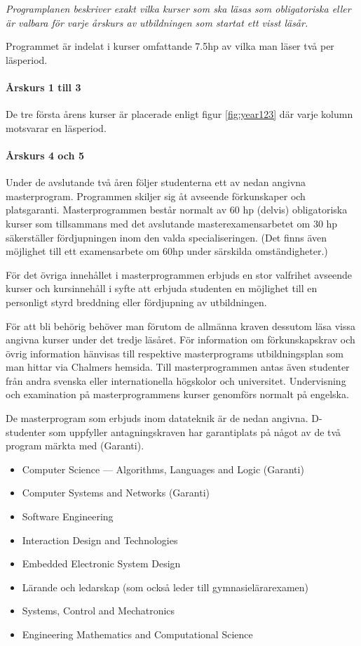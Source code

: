 \documentclass[twocolumn]{article}
\newcommand{\meta}[1]{{\small \emph{#1}}}
\begin{document}
\meta{Programplanen beskriver exakt vilka kurser som ska läsas som
  obligatoriska eller är valbara för varje årskurs av utbildningen
  som startat ett visst läsår.}

Programmet är indelat i kurser omfattande 7.5hp av vilka man läser
två per läsperiod.
\paragraph{Årskurs 1 till 3} De tre första årens kurser är placerade
enligt figur \ref{fig:year123} där varje kolumn motsvarar en läsperiod.

\paragraph{Årskurs 4 och 5}

Under de avslutande två åren följer studenterna ett av nedan angivna
masterprogram.  Programmen skiljer sig åt avseende förkunskaper och
platsgaranti.  Masterprogrammen består normalt av 60 hp (delvis)
obligatoriska kurser som tillsammans med det avslutande
masterexamensarbetet om 30 hp säkerställer fördjupningen inom den
valda specialiseringen. (Det finns även möjlighet till ett
examensarbete om 60hp under särskilda omständigheter.)

För det övriga innehållet i masterprogrammen erbjuds en stor valfrihet
avseende kurser och kursinnehåll i syfte att erbjuda studenten en
möjlighet till en personligt styrd breddning eller fördjupning av
utbildningen.

För att bli behörig behöver man förutom de allmänna kraven dessutom
läsa vissa angivna kurser under det tredje läsåret. För information om
förkunskapskrav och övrig information hänvisas till respektive
masterprograms utbildningsplan som man hittar via Chalmers
hemsida. Till masterprogrammen antas även studenter från andra svenska
eller internationella högskolor och universitet.  Undervisning och
examination på masterprogrammens kurser genomförs normalt på engelska.

De masterprogram som erbjuds inom datateknik är de nedan
angivna. D-studenter som uppfyller antagningskraven har garantiplats
på något av de två program märkta med (Garanti).

\begin{itemize}
\item \foreignlanguage{british}{Computer Science --- Algorithms,
    Languages and Logic} (Garanti)
\item \foreignlanguage{british}{Computer Systems and Networks} (Garanti)
\item \foreignlanguage{british}{Software Engineering}
\item \foreignlanguage{british}{Interaction Design and Technologies}
\item \foreignlanguage{british}{Embedded Electronic System Design}
\item Lärande och ledarskap (som också leder till gymnasielärarexamen)
\item \foreignlanguage{british}{Systems, Control and Mechatronics}
\item \foreignlanguage{british}{Engineering Mathematics and Computational Science}
\end{itemize}
\end{document}
